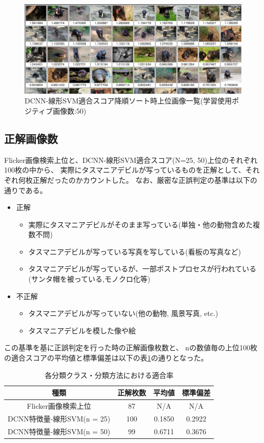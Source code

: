 \documentclass[11pt,a4paper, uplatex]{jsreport}
\begin{document}
\begin{figure}[t]
  \begin{center}
    \includegraphics[scale=0.25,angle=90]{imgs/score50-upper.jpg}
    \caption{DCNN-線形SVM適合スコア降順ソート時上位画像一覧(学習使用ポジティブ画像数:50)}
    \label{fig:downer50}
  \end{center}
\end{figure}
\subsection{正解画像数}
Flicker画像検索上位と、DCNN-線形SVM適合スコア(N=25, 50)上位のそれぞれ100枚の中から、
実際にタスマニアデビルが写っているものを正解として、それぞれ何枚正解だったのかカウントした。
なお、厳密な正誤判定の基準は以下の通りである。
\begin{itemize}
  \item 正解
  \begin{itemize}
    \item 実際にタスマニアデビルがそのまま写っている(単独・他の動物含めた複数不問)
    \item タスマニアデビルが写っている写真を写している(看板の写真など)
    \item タスマニアデビルが写っているが、一部ポストプロセスが行われている(サンタ帽を被っている,モノクロ化等)
  \end{itemize}
  \item 不正解
  \begin{itemize}
    \item タスマニアデビルが写っていない(他の動物, 風景写真, etc.)
    \item タスマニアデビルを模した像や絵
  \end{itemize}
\end{itemize}
この基準を基に正誤判定を行った時の正解画像枚数と、
nの数値毎の上位100枚の適合スコアの平均値と標準偏差は以下の表\ref{tb:crct}の通りとなった。
\begin{table}[h]
  \caption{各分類クラス・分類方法における適合率}
  \label{tb:crct}
  \begin{center}
    \begin{tabular}{cccc} \hline
      種類 & 正解枚数 & 平均値 & 標準偏差 \\ \hline
      Flicker画像検索上位 & 87 & N/A & N/A \\
      DCNN特徴量-線形SVM(n = 25) & 100 & 0.1850 & 0.2922 \\
      DCNN特徴量-線形SVM(n = 50) & 99 & 0.6711 & 0.3676 \\ \hline
    \end{tabular}
  \end{center}
\end{table}
\end{document}
